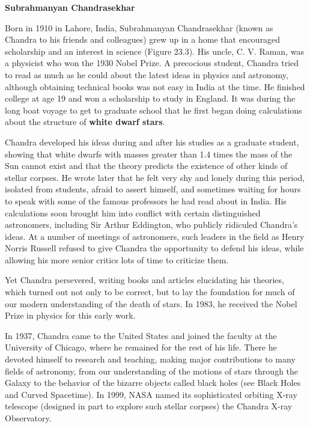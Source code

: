 \documentclass{article}
\numberwithin{equation}{section}
\numberwithin{figure}{section}
\begin{document}
\begin{mdframed}[backgroundcolor=black!10]
\textbf{Subrahmanyan Chandrasekhar}
\vspace{1ex}

Born in 1910 in Lahore, India, Subrahmanyan Chandrasekhar (known as Chandra to his friends and colleagues) grew up in a home that encouraged scholarship and an interest in science (Figure 23.3). His uncle, C. V. Raman, was a physicist who won the 1930 Nobel Prize. A precocious student, Chandra tried to read as much as he could about the latest ideas in physics and astronomy, although obtaining technical books was not easy in India at the time. He finished college at age 19 and won a scholarship to study in England. It was during the long boat voyage to get to graduate school that he first began doing calculations about the structure of \textbf{white dwarf stars}.
\vspace{1em}

Chandra developed his ideas during and after his studies as a graduate student, showing that white dwarfs with masses greater than 1.4 times the mass of the Sun cannot exist and that the theory predicts the existence of other kinds of stellar corpses. He wrote later that he felt very shy and lonely during this period, isolated from students, afraid to assert himself, and sometimes waiting for hours to speak with some of the famous professors he had read about in India. His calculations soon brought him into conflict with certain distinguished astronomers, including Sir Arthur Eddington, who publicly ridiculed Chandra's ideas. At a number of meetings of astronomers, such leaders in the field as Henry Norris Russell refused to give Chandra the opportunity to defend his ideas, while allowing his more senior critics lots of time to criticize them.
\vspace{1em}

Yet Chandra persevered, writing books and articles elucidating his theories, which turned out not only to be correct, but to lay the foundation for much of our modern understanding of the death of stars. In 1983, he received the Nobel Prize in physics for this early work.
\vspace{1em}

In 1937, Chandra came to the United States and joined the faculty at the University of Chicago, where he remained for the rest of his life. There he devoted himself to research and teaching, making major contributions to many fields of astronomy, from our understanding of the motions of stars through the Galaxy to the behavior of the bizarre objects called black holes (see Black Holes and Curved Spacetime). In 1999, NASA named its sophisticated orbiting X-ray telescope (designed in part to explore such stellar corpses) the Chandra X-ray Observatory.
\vspace{1em}



\end{mdframed}
\end{document}
